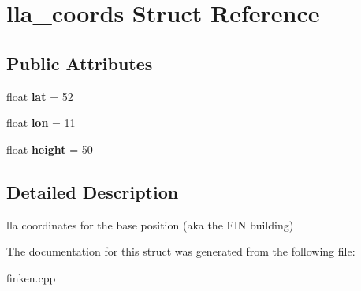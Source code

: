\hypertarget{structlla__coords}{}\section{lla\+\_\+coords Struct Reference}
\label{structlla__coords}
\subsection*{Public Attributes}
\begin{DoxyCompactItemize}
\item 
float {\bfseries lat} = 52\hypertarget{structlla__coords_a1c1072469e8272e10fba298c2a21656c}{}\label{structlla__coords_a1c1072469e8272e10fba298c2a21656c}

\item 
float {\bfseries lon} = 11\hypertarget{structlla__coords_a28ccc6c3e258a13b931102479a81d309}{}\label{structlla__coords_a28ccc6c3e258a13b931102479a81d309}

\item 
float {\bfseries height} = 50\hypertarget{structlla__coords_abdc3be56573ef86b19d3e4638558f1f2}{}\label{structlla__coords_abdc3be56573ef86b19d3e4638558f1f2}

\end{DoxyCompactItemize}


\subsection{Detailed Description}
lla coordinates for the base position (aka the F\+IN building) 

The documentation for this struct was generated from the following file\+:\begin{DoxyCompactItemize}
\item 
finken.\+cpp\end{DoxyCompactItemize}

